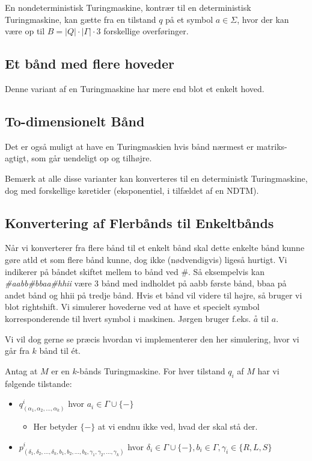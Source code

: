 En nondeterministisk Turingmaskine, kontrær til en deterministisk Turingmaskine, kan gætte fra en tilstand $q$ på et symbol $a \in \Sigma$, hvor der kan være op til $B = |Q| \cdot |\Gamma| \cdot 3$ forskellige overføringer.

\subsection{Et bånd med flere hoveder}%
\label{subsec:label}

Denne variant af en Turingmaskine har mere end blot et enkelt hoved.

\subsection{To-dimensionelt Bånd}%
\label{subsec:label}

Det er også muligt at have en Turingmaskien hvis bånd nærmest er matriks-agtigt, som går uendeligt op og tilhøjre.

Bemærk at alle disse varianter kan konverteres til en deterministk Turingmaskine, dog med forskellige køretider (eksponentiel, i tilfældet af en NDTM).

\subsection{Konvertering af Flerbånds til Enkeltbånds}%
\label{subsec:label}

Når vi konverterer fra flere bånd til et enkelt bånd skal dette enkelte bånd kunne gøre atld et som flere bånd kunne, dog ikke (nødvendigvis) ligeså hurtigt. Vi indikerer på båndet skiftet mellem to bånd ved \#. Så eksempelvis kan \textit{\#aabb\#bbaa\#hhii} være 3 bånd med indholdet på aabb første bånd, bbaa på andet bånd og hhii på tredje bånd. Hvis et bånd vil videre til højre, så bruger vi blot rightshift. Vi simulerer hovederne ved at have et specielt symbol korresponderende til hvert symbol i maskinen. Jørgen bruger f.eks. $\stackrel{\circ}{a}$ til $a$.

Vi vil dog gerne se præcis hvordan vi implementerer den her simulering, hvor vi går fra $k$ bånd til ét.

Antag at $M$ er en $k$-bånds Turingmaskine. For hver tilstand $q_{i}$ af $M$ har vi følgende tilstande:
\begin{itemize}
	\item $q^{i}_{(\alpha_{1}, \alpha_{2}, \ldots, \alpha_{k})}$ hvor $a_{i} \in \Gamma \cup \{-\}$
	      \begin{itemize}
		      \item Her betyder $\{-\}$ at vi endnu ikke ved, hvad der skal stå der.
	      \end{itemize}
	\item $p^{i}_{(\delta_{1}, \delta_{2}, \ldots, \delta_{k}, b_{1}, b_{2}, \ldots, b_{k}, \gamma_{1}, \gamma_{2}, \ldots, \gamma_{k})}$ hvor $\delta_{i} \in \Gamma \cup \{-\}, b_{i} \in \Gamma, \gamma_{i} \in \{R, L, S\}$
\end{itemize}

